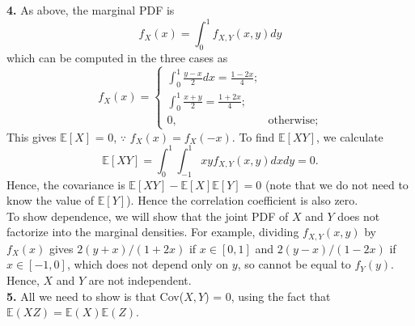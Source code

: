 \documentclass[aps,prl,groupedaddress,amsmath,amssymb,nofootinbib,12pt]{revtex4-1}
\begin{document}
\textbf{4.} As above, the marginal PDF is
\[f_X(x) = \int_0^1 f_{X,Y} (x, y) dy\]
which can be computed in the three cases as
\[f_{X}(x) = \begin{cases} \int_0^1\frac{y-x}{2}dx=\frac{1-2x}{4};\\ \int_0^1\frac{x+y}{2} = \frac{1+2x}{4};\\ 0, & \text{otherwise}; \end{cases}\]
This gives $\mathbb{E}[X]$ = 0, $\because$ $f_X(x) = f_X(-x)$. To find $\mathbb{E}[XY]$, we calculate
\[\mathbb{E}[XY] = \int_0^1 \int_{-1}^1 xy f_{X,Y} (x, y) dxdy = 0.\]
Hence, the covariance is $\mathbb{E}[XY]-\mathbb{E}[X]\mathbb{E}[Y ] = 0$ (note that we do not need to know the value of $\mathbb{E}[Y]$). Hence the correlation coefficient is also zero.\\

To show dependence, we will show that the joint PDF of $X$ and $Y$ does not factorize into the marginal densities. For example, dividing $f_{X,Y} (x, y)$ by $f_X(x)$ gives $2(y+x)/(1+2x)$ if $x \in [0, 1]$ and $2(y-x)/
(1-2x)$ if $x \in [-1, 0]$, which does not depend only on $y$, so cannot be equal to $f_Y (y)$. Hence,
$X$ and $Y$ are not independent.\\

\textbf{5.} All we need to show is that Cov($X,Y$) = 0, using the fact that $\mathbb{E}(XZ) = \mathbb{E}(X)\mathbb{E}(Z)$.
\end{document}
